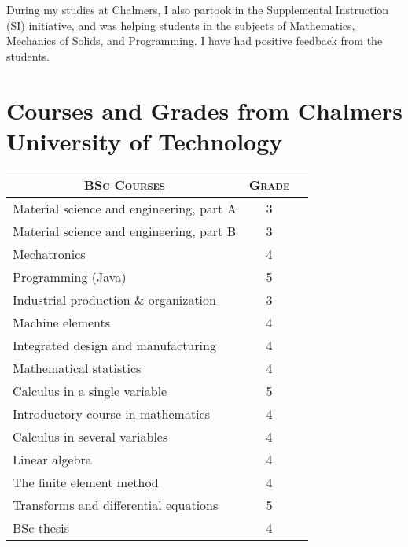 \documentclass[a4paper,10pt]{article} %
\begin{document}
{During my studies at Chalmers, I also partook in the Supplemental Instruction (SI) initiative, and was helping students in the subjects of Mathematics, Mechanics of Solids, and Programming.
I have had positive feedback from the students.

\newpage

\section{Courses and Grades from Chalmers University of Technology}

\begin{center}
\begin{tabular}{lcc}

\multicolumn{1}{c}{\textsc{BSc Courses}} & \textsc{Grade}\\
\hline
Material science and engineering, part A  & 3\\
Material science and engineering, part B & 3\\
Mechatronics & 4\\
Programming (Java) & 5\\
Industrial production \& organization & 3\\
Machine elements & 4\\
Integrated design and manufacturing & 4\\
Mathematical statistics & 4\\
Calculus in a single variable & 5\\
Introductory course in mathematics & 4\\
Calculus in several variables & 4\\
Linear algebra & 4\\
The finite element method & 4\\
Transforms and differential equations & 5\\
BSc thesis & 4\\


\end{tabular}
\end{center}}
\end{document}
